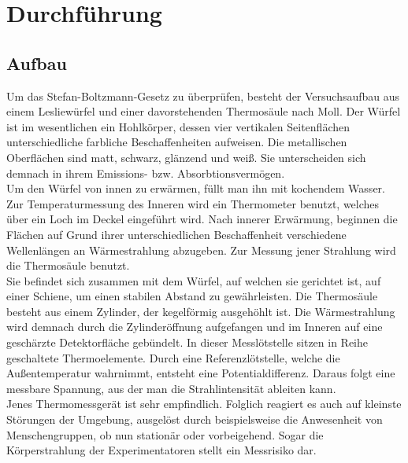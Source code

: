 \section{Durchführung}
\label{sec:Durchführung}
\subsection{Aufbau}
Um das Stefan-Boltzmann-Gesetz zu überprüfen, besteht der Versuchsaufbau aus einem Lesliewürfel und einer davorstehenden Thermosäule nach Moll.
Der Würfel ist im wesentlichen ein Hohlkörper, dessen vier vertikalen Seitenflächen unterschiedliche farbliche Beschaffenheiten aufweisen.
Die metallischen Oberflächen sind matt, schwarz, glänzend und weiß.
Sie unterscheiden sich demnach in ihrem Emissions- bzw. Absorbtionsvermögen.\\
Um den Würfel von innen zu erwärmen, füllt man ihn mit kochendem Wasser.
Zur Temperaturmessung des Inneren wird ein Thermometer benutzt, welches über ein Loch im Deckel eingeführt wird.
Nach innerer Erwärmung, beginnen die Flächen auf Grund ihrer unterschiedlichen Beschaffenheit verschiedene Wellenlängen an Wärmestrahlung abzugeben.
Zur Messung jener Strahlung wird die Thermosäule benutzt.\\
Sie befindet sich zusammen mit dem Würfel, auf welchen sie gerichtet ist, auf einer Schiene, um einen stabilen Abstand zu gewährleisten.
Die Thermosäule besteht aus einem Zylinder, der kegelförmig ausgehöhlt ist.
Die Wärmestrahlung wird demnach durch die Zylinderöffnung aufgefangen und im Inneren auf eine geschärzte Detektorfläche gebündelt.
In dieser Messlötstelle sitzen in Reihe geschaltete Thermoelemente.
Durch eine Referenzlötstelle, welche die Außentemperatur wahrnimmt, entsteht eine Potentialdifferenz.
Daraus folgt eine messbare Spannung, aus der man die Strahlintensität ableiten kann.\\
Jenes Thermomessgerät ist sehr empfindlich.
Folglich reagiert es auch auf kleinste Störungen der Umgebung, ausgelöst durch beispielsweise die Anwesenheit von Menschengruppen, ob nun stationär oder vorbeigehend.
Sogar die Körperstrahlung der Experimentatoren stellt ein Messrisiko dar.

